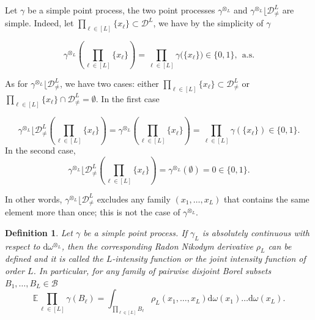 \documentclass[twoside,11pt]{book}
\newtheorem{definition}{Definition}
\numberwithin{theorem}{chapter}
\numberwithin{definition}{chapter}
\numberwithin{proposition}{chapter}
\numberwithin{corollary}{chapter}
\numberwithin{example}{chapter}
\numberwithin{lemma}{chapter}
\numberwithin{assumption}{chapter}
\begin{document}
Let $\gamma$ be a simple point process, the two point processes $\gamma^{\otimes_{L}}$ and $\gamma^{\otimes_{L}} \lfloor \mathcal{D}_{\neq}^{L}$ are simple. Indeed, let $\prod\limits_{\ell \in [L]} \{x_{\ell} \} \subset \mathcal{D}^{L}$, we have by the simplicity of $\gamma$

\begin{equation}
\gamma^{\otimes_{L}} (\prod\limits_{\ell \in [L]} \{x_{\ell } \}) = \prod\limits_{\ell \in [L]} \gamma\big(\{x_{\ell } \} \big) \in \{0,1\} , \:\: \text{a.s.}
\end{equation}

As for $\gamma^{\otimes_{L}} \lfloor \mathcal{D}_{\neq}^{L}$, we have two cases: either $\prod\limits_{\ell \in [L]} \{x_{\ell} \} \subset \mathcal{D}_{\neq}^{L}$ or $\prod\limits_{\ell \in [L]} \{x_{\ell} \} \cap \mathcal{D}_{\neq}^{L} = \emptyset$. In the first case

\begin{equation}
\gamma^{\otimes_{L}} \lfloor \mathcal{D}_{\neq}^{L}(\prod\limits_{\ell \in [L]} \{x_{\ell } \}) = \gamma^{\otimes_{L}} (\prod\limits_{\ell \in [L]} \{x_{\ell } \}) = \prod\limits_{\ell \in [L]} \gamma(\{x_\ell \}) \in \{ 0,1\}.
\end{equation}
In the second case, 
\begin{equation}
\gamma^{\otimes_{L}} \lfloor \mathcal{D}_{\neq}^{L}(\prod\limits_{\ell \in [L]} \{x_{\ell } \}) = \gamma^{\otimes_{L}} (\emptyset) = 0 \in \{ 0,1\}.
\end{equation}


In other words, $\gamma^{\otimes_{L}} \lfloor \mathcal{D}_{\neq}^{L}$ excludes any family $(x_{1}, \dots, x_{L})$ that contains the same element more than once; this is not the case of $\gamma^{\otimes_{L}}$.





\begin{definition}
Let $\gamma$ be a simple point process.
If $\gamma_{L}$ is absolutely continuous with respect to $\mathrm{d}\omega^{\otimes_L}$, then the corresponding Radon Nikodym derivative $\rho_{L}$ can be defined and it is called the $L$-intensity function or the joint intensity function of order $L$. In particular, for any family of pairwise disjoint Borel subsets $B_{1}, \dots, B_{L} \in \mathcal{B}$
\begin{equation}\label{eq:pointprocess_intensity_L}
\mathbb{E} \prod\limits_{\ell \in [L]} \gamma(B_{\ell}) = \int_{\prod\limits_{\ell \in [L]}B_{\ell}} \rho_{L}(x_{1}, \dots, x_{L}) \mathrm{d}\omega(x_{1}) \dots \mathrm{d}\omega(x_{L}).
\end{equation}
 \end{definition}
\end{document}
